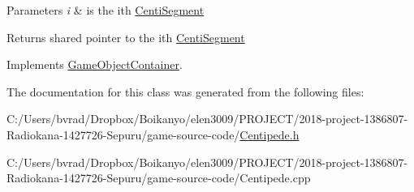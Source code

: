 \begin{DoxyParams}{Parameters}
{\em i} & is the ith \mbox{\hyperlink{class_centi_segment}{Centi\+Segment}} \\
\hline
\end{DoxyParams}
\begin{DoxyReturn}{Returns}
shared pointer to the ith \mbox{\hyperlink{class_centi_segment}{Centi\+Segment}} 
\end{DoxyReturn}


Implements \mbox{\hyperlink{class_game_object_container_affa50b43ca7b82d54055b6499e024aba}{Game\+Object\+Container}}.



The documentation for this class was generated from the following files\+:\begin{DoxyCompactItemize}
\item 
C\+:/\+Users/bvrad/\+Dropbox/\+Boikanyo/elen3009/\+P\+R\+O\+J\+E\+C\+T/2018-\/project-\/1386807-\/\+Radiokana-\/1427726-\/\+Sepuru/game-\/source-\/code/\mbox{\hyperlink{_centipede_8h}{Centipede.\+h}}\item 
C\+:/\+Users/bvrad/\+Dropbox/\+Boikanyo/elen3009/\+P\+R\+O\+J\+E\+C\+T/2018-\/project-\/1386807-\/\+Radiokana-\/1427726-\/\+Sepuru/game-\/source-\/code/Centipede.\+cpp\end{DoxyCompactItemize}
